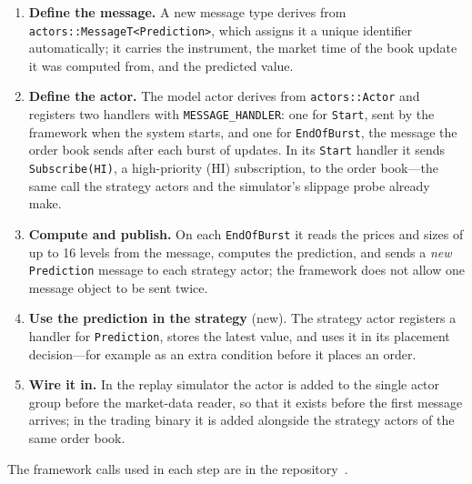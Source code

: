 \begin{enumerate}[leftmargin=1.8em,itemsep=2pt]
\item \textbf{Define the message.} A new message type derives from \texttt{actors::MessageT<Prediction>}, which
  assigns it a unique identifier automatically; it carries the instrument, the market time of the book update it
  was computed from, and the predicted value.
\item \textbf{Define the actor.} The model actor derives from \texttt{actors::Actor} and registers two handlers
  with \texttt{MESSAGE\_HANDLER}: one for \texttt{Start}, sent by the framework when the system starts, and one for
  \texttt{EndOfBurst}, the message the order book sends after each burst of updates. In its \texttt{Start} handler it
  sends \texttt{Subscribe(HI)}, a high-priority (HI) subscription, to the order book---the same call the strategy actors and the simulator's slippage
  probe already make.
\item \textbf{Compute and publish.} On each \texttt{EndOfBurst} it reads the prices and sizes of up to 16 levels
  from the message, computes the prediction, and sends a \emph{new} \texttt{Prediction} message to each strategy
  actor; the framework does not allow one message object to be sent twice.
\item \textbf{Use the prediction in the strategy} (new). The strategy actor registers a handler for
  \texttt{Prediction}, stores the latest value, and uses it in its placement decision---for example as an extra
  condition before it places an order.
\item \textbf{Wire it in.} In the replay simulator the actor is added to the single actor group before the
  market-data reader, so that it exists before the first message arrives; in the trading binary it is added
  alongside the strategy actors of the same order book.
\end{enumerate}

The framework calls used in each step are in the \kasparhft{} repository~\citep{kaspar_hft}.

